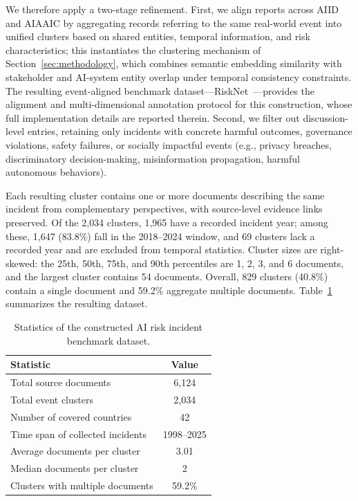 \documentclass[a4paper,fleqn]{cas-dc}
\begin{document}
We therefore apply a two-stage refinement.
First, we align reports across AIID and AIAAIC by aggregating records
referring to the same real-world event into unified clusters based on
shared entities, temporal information, and risk characteristics;
this instantiates the clustering mechanism of
Section~\ref{sec:methodology}, which combines semantic embedding
similarity with stakeholder and AI-system entity overlap under temporal
consistency constraints. The resulting event-aligned benchmark
dataset---RiskNet~\cite{zhang2026risknet}---provides the alignment
and multi-dimensional annotation protocol for this construction,
whose full implementation details are reported therein.
Second, we filter out discussion-level entries, retaining only incidents
with concrete harmful outcomes, governance violations, safety failures,
or socially impactful events (e.g., privacy breaches, discriminatory
decision-making, misinformation propagation, harmful autonomous
behaviors).

Each resulting cluster contains one or more documents describing the
same incident from complementary perspectives, with source-level
evidence links preserved.
Of the 2{,}034 clusters, 1{,}965 have a recorded incident year; among
these, 1{,}647 (83.8\%) fall in the 2018--2024 window, and 69 clusters
lack a recorded year and are excluded from temporal statistics.
Cluster sizes are right-skewed: the 25th, 50th, 75th, and 90th
percentiles are 1, 2, 3, and 6 documents, and the largest cluster
contains 54 documents.
Overall, 829 clusters (40.8\%) contain a single document and 59.2\%
aggregate multiple documents.
Table~\ref{tab:dataset_statistics} summarizes the resulting dataset.

\begin{table}[t]
\centering
\caption{Statistics of the constructed AI risk incident benchmark dataset.}
\label{tab:dataset_statistics}
\small
\begin{tabular}{l c}
\toprule
\textbf{Statistic} & \textbf{Value} \\
\midrule
Total source documents & 6{,}124 \\
Total event clusters & 2{,}034 \\
Number of covered countries & 42 \\
Time span of collected incidents & 1998--2025 \\
Average documents per cluster & 3.01 \\
Median documents per cluster & 2 \\
Clusters with multiple documents & 59.2\% \\
\bottomrule
\end{tabular}
\end{table}
\end{document}
